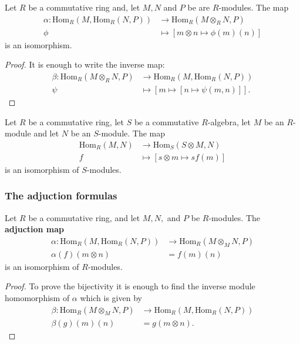 \documentclass[12pt, a4paper]{article}
\begin{document}
\begin{proposition}
    Let \(R\) be a commutative ring and, let \(M,N\) and \(P\) be are \(R\)-modules. The map 
    \[\begin{aligned}
        \alpha : \text{Hom}_R(M,\text{Hom}_R(N,P)) &\to \text{Hom}_R(M\otimes_R N,P) \\
        \phi &\mapsto [m\otimes n \mapsto \phi(m)(n)]
    \end{aligned}\]
    is an isomorphism.
\end{proposition}

\begin{proof}
    It is enough to write the inverse map:
    \[\begin{aligned}
        \beta:\text{Hom}_R(M\otimes_R N,P) &\to \text{Hom}_R(M,\text{Hom}_R(N,P)) \\
        \psi &\mapsto [m\mapsto [n\mapsto \psi(m,n)]].
    \end{aligned}\]
\end{proof}

\begin{proposition}
    Let \(R\) be a commutative ring, let \(S\) be a commutative \(R\)-algebra, let \(M\) be an \(R\)-module and let \(N\) be an \(S\)-module. The map 
    \[\begin{aligned}
        \text{Hom}_R(M,N) &\to \text{Hom}_S(S\otimes M,N) \\
        f&\mapsto [s\otimes m \mapsto sf(m)]
    \end{aligned}\]
    is an isomorphism of \(S\)-modules.
\end{proposition}

\subsubsection{The adjuction formulas}

\begin{mdprop}
    Let \(R\) be a commutative ring, and let \(M,N,\) and \(P\) be \(R\)-modules. The \textbf{adjuction map}
    \[\begin{aligned}
        \alpha : \text{Hom}_R(M,\text{Hom}_R(N,P)) &\to \text{Hom}_R(M\otimes_M N,P)\\
        \alpha(f)(m\otimes n)&=f(m)(n)
    \end{aligned}\]
    is an isomorphism of \(R\)-modules.
\end{mdprop}

\begin{proof}
    To prove the bijectivity it is enough to find the inverse module homomorphism of \(\alpha\) which is given by 
    \[\begin{aligned}
        \beta:\text{Hom}_R(M\otimes_M N,P) &\to \text{Hom}_R(M,\text{Hom}_R(N,P))\\
        \beta(g)(m)(n)&=g(m\otimes n).
    \end{aligned}\]
\end{proof}
\end{document}
